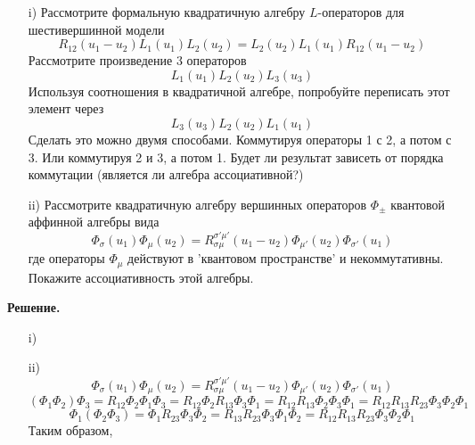 \documentclass[12pt]{article}
\theoremstyle{definition}
\begin{document}
\begin{enumerate}
\begin{itemize}
        \item[i)] Рассмотрите формальную квадратичную алгебру $L$-операторов для шестивершинной модели
        \begin{equation}
            R_{12}(u_1-u_2)L_1(u_1)L_2(u_2)=L_2(u_2)L_1(u_1)R_{12}(u_1-u_2)
        \end{equation}
        Рассмотрите произведение 3 операторов
        \begin{equation}
            L_1(u_1)L_2(u_2)L_3(u_3)
        \end{equation}
        Используя соотношения в квадратичной алгебре, попробуйте переписать этот элемент через
        \begin{equation}
            L_3(u_3)L_2(u_2)L_1(u_1)
        \end{equation}
        Сделать это можно двумя способами. Коммутируя операторы 1 с 2, а потом с 3. Или коммутируя 2 и 3, а потом 1. Будет ли результат зависеть от порядка коммутации (является ли алгебра ассоциативной?)
        \item[ii)] Рассмотрите квадратичную алгебру вершинных операторов $\Phi_\pm$ квантовой аффинной алгебры вида
        \begin{equation}
            \Phi_{\sigma}(u_1)\Phi_\mu(u_2)=R^{\sigma'\mu'}_{\sigma\mu}(u_1-u_2)\Phi_{\mu'}(u_2)\Phi_{\sigma'}(u_1)
        \end{equation}
        где операторы $\Phi_\mu$ действуют в 'квантовом пространстве' и некоммутативны. Покажите ассоциативность этой алгебры.
    \end{itemize}
    \textbf{Решение.}
    \begin{itemize}
        \item[i)]
        \item[ii)]
        \begin{equation}
            \Phi_{\sigma}(u_1)\Phi_\mu(u_2)=R^{\sigma'\mu'}_{\sigma\mu}(u_1-u_2)\Phi_{\mu'}(u_2)\Phi_{\sigma'}(u_1)
        \end{equation}
        \begin{equation*}
            (\Phi_1\Phi_2)\Phi_3=R_{12}\Phi_2\Phi_1\Phi_3=R_{12}\Phi_2R_{13}\Phi_3\Phi_1=R_{12}R_{13}\Phi_2\Phi_3\Phi_1=R_{12}R_{13}R_{23}\Phi_3\Phi_2\Phi_1
        \end{equation*}
        \begin{equation*}
            \Phi_1(\Phi_2\Phi_3)=\Phi_1R_{23}\Phi_3\Phi_2=R_{13}R_{23}\Phi_3\Phi_1\Phi_2=R_{12}R_{13}R_{23}\Phi_3\Phi_2\Phi_1
        \end{equation*}
        Таким образом,

\end{itemize}
\end{enumerate}
\end{document}
